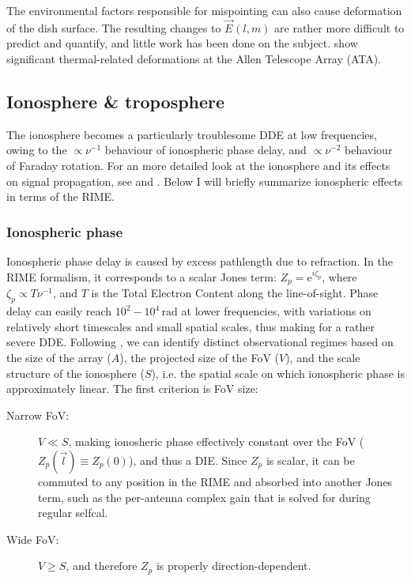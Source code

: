 \documentclass[referee]{aa}
\newcommand{\jones}[2]{\vec {#1}_{#2}}
\begin{document}
The environmental factors responsible for mispointing can also cause deformation of the dish surface. The resulting changes to $\jones{E}{}(l,m)$ are rather more difficult to predict and quantify, and little work has been done on the subject. \citet{Harp:ATA-beams} show significant thermal-related deformations at the Allen Telescope Array (ATA).

\subsection{Ionosphere \& troposphere}

The ionosphere becomes a particularly troublesome DDE at low frequencies, owing to the $\propto\nu^{-1}$ behaviour of ionospheric phase delay, and $\propto\nu^{-2}$ behaviour of Faraday rotation. For an more detailed look at the ionosphere and its effects on signal propagation, see \citet[Sect.~13.3]{tms} and \citet{Intema:SPAM}. Below I will briefly summarize ionospheric effects in terms of the RIME.

\subsubsection{Ionospheric phase}

Ionospheric phase delay is caused by excess pathlength due to refraction. In the RIME formalism, it corresponds to a scalar Jones term: $Z_p=\mathrm{e}^{i\zeta_p}$, where $\zeta_p\propto T \nu^{-1}$, and $T$ is the Total Electron Content along the line-of-sight. Phase delay can easily reach $10^2-10^4\,\mathrm{rad}$ at lower frequencies, with variations on relatively short timescales and small spatial scales, thus making for a rather severe DDE. Following \citet{Lonsdale:4regimes}, we can identify distinct observational regimes based on the size of the array ($A$), the projected size of the FoV ($V$), and the scale structure of the ionosphere ($S$), i.e. the spatial scale on which ionospheric phase is approximately linear. The first criterion is FoV size:

\begin{description}
\item[Narrow FoV:] $V\ll S$, making ionosheric phase effectively constant over the FoV ($Z_p(\vec l)\equiv Z_p(0)$), and thus a DIE.
Since $Z_p$ is scalar, it can be commuted to any position in the RIME and absorbed into another Jones term, such as the per-antenna complex gain that is solved for during regular selfcal.
\item[Wide FoV:] $V\ge S$, and therefore $Z_p$ is properly direction-dependent.
\end{description}
\end{document}
